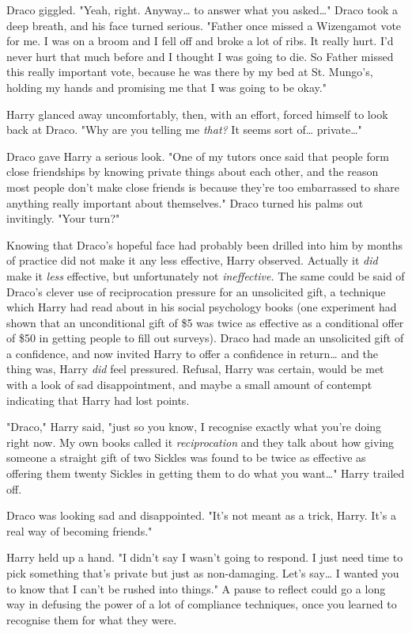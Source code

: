 Draco giggled. "Yeah, right. Anyway{\ldots} to answer what you asked{\ldots}"
Draco took a deep breath, and his face turned serious. "Father once missed a
Wizengamot vote for me. I was on a broom and I fell off and broke a lot of
ribs. It really hurt. I'd never hurt that much before and I thought I was going
to die. So Father missed this really important vote, because he was there by my
bed at St. Mungo's, holding my hands and promising me that I was going to be
okay."

Harry glanced away uncomfortably, then, with an effort, forced himself to look
back at Draco. "Why are you telling me \emph{that?} It seems sort of{\ldots}
private{\ldots}"

Draco gave Harry a serious look. "One of my tutors once said that people form
close friendships by knowing private things about each other, and the reason
most people don't make close friends is because they're too embarrassed to
share anything really important about themselves." Draco turned his palms out
invitingly. "Your turn?"

Knowing that Draco's hopeful face had probably been drilled into him by months
of practice did not make it any less effective, Harry observed. Actually it
\emph{did} make it \emph{less} effective, but unfortunately not
\emph{ineffective.} The same could be said of Draco's clever use of
reciprocation pressure for an unsolicited gift, a technique which Harry had
read about in his social psychology books (one experiment had shown that an
unconditional gift of \$5 was twice as effective as a conditional offer of \$50
in getting people to fill out surveys). Draco had made an unsolicited gift of a
confidence, and now invited Harry to offer a confidence in return{\ldots} and
the thing was, Harry \emph{did} feel pressured. Refusal, Harry was certain,
would be met with a look of sad disappointment, and maybe a small amount of
contempt indicating that Harry had lost points.

"Draco," Harry said, "just so you know, I recognise exactly what you're doing
right now. My own books called it \emph{reciprocation} and they talk about how
giving someone a straight gift of two Sickles was found to be twice as
effective as offering them twenty Sickles in getting them to do what you
want{\ldots}" Harry trailed off.

Draco was looking sad and disappointed. "It's not meant as a trick, Harry. It's
a real way of becoming friends."

Harry held up a hand. "I didn't say I wasn't going to respond. I just need time
to pick something that's private but just as non-damaging. Let's say{\ldots} I
wanted you to know that I can't be rushed into things." A pause to reflect
could go a long way in defusing the power of a lot of compliance techniques,
once you learned to recognise them for what they were.


